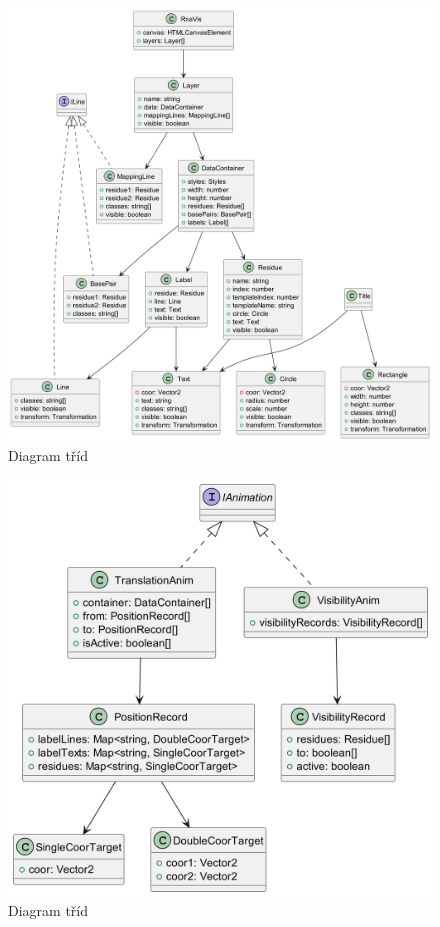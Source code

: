 \begin{figure}[H]
  \centering
  \includegraphics[width=145mm]{../img/kap03/rnavis.png}
  \caption{Diagram tříd}
\end{figure}

\begin{figure}[H]
  \centering
  \includegraphics[width=145mm]{../img/kap03/animation.png}
  \caption{Diagram tříd}
\end{figure}

